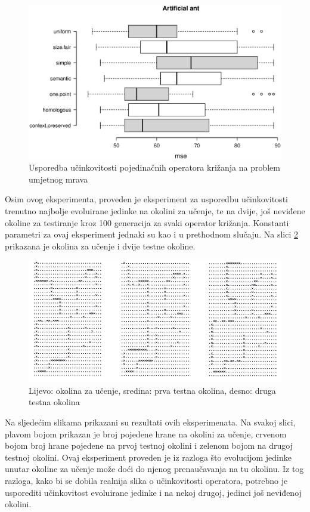 \begin{figure}[H]
	\centering
	\includegraphics[trim=0cm 4cm 0cm 0cm, scale=0.6]{./slike/boxPlots/ant.eps}
	\caption{Usporedba učinkovitosti pojedinačnih operatora križanja na problem umjetnog mrava}
	\label{antbox}
\end{figure}

Osim ovog eksperimenta, proveden je eksperiment za usporedbu učinkovitosti trenutno najbolje evoluirane jedinke na okolini za učenje, te na dvije, još neviđene okoline za testiranje kroz 100 generacija za svaki operator križanja. Konstanti parametri za ovaj eksperiment jednaki su kao i u prethodnom slučaju. Na slici \ref{trails} prikazana je okolina za učenje i dvije testne okoline.

\begin{figure}[H]
	\centering
	\includegraphics[scale=0.5]{./slike/cross-validation/trails.png}
	\caption{Lijevo: okolina za učenje, sredina: prva testna okolina, desno: druga testna okolina}
	\label{trails}
\end{figure}

Na sljedećim slikama prikazani su rezultati ovih eksperimenata. Na svakoj slici, plavom bojom prikazan je broj pojedene hrane na okolini za učenje, crvenom bojom broj hrane pojedene na prvoj testnoj okolini i zelenom bojom na drugoj testnoj okolini. Ovaj eksperiment proveden je iz razloga što evolucijom jedinke unutar okoline za učenje može doći do njenog prenaučavanja na tu okolinu. Iz tog razloga, kako bi se dobila realnija slika o učinkovitosti operatora, potrebno je usporediti učinkovitost evoluirane jedinke i na nekoj drugoj, jedinci još neviđenoj okolini.

